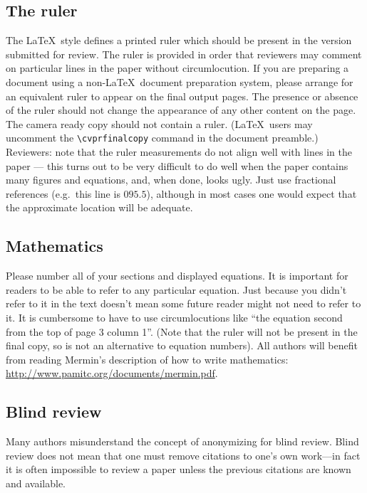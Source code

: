 \subsection{The ruler}
The \LaTeX\ style defines a printed ruler which should be present in the
version submitted for review.  The ruler is provided in order that
reviewers may comment on particular lines in the paper without
circumlocution.  If you are preparing a document using a non-\LaTeX\
document preparation system, please arrange for an equivalent ruler to
appear on the final output pages.  The presence or absence of the ruler
should not change the appearance of any other content on the page.  The
camera ready copy should not contain a ruler. (\LaTeX\ users may uncomment
the \verb'\cvprfinalcopy' command in the document preamble.)  Reviewers:
note that the ruler measurements do not align well with lines in the paper
--- this turns out to be very difficult to do well when the paper contains
many figures and equations, and, when done, looks ugly.  Just use fractional
references (e.g.\ this line is $095.5$), although in most cases one would
expect that the approximate location will be adequate.

\subsection{Mathematics}

Please number all of your sections and displayed equations.  It is
important for readers to be able to refer to any particular equation.  Just
because you didn't refer to it in the text doesn't mean some future reader
might not need to refer to it.  It is cumbersome to have to use
circumlocutions like ``the equation second from the top of page 3 column
1''.  (Note that the ruler will not be present in the final copy, so is not
an alternative to equation numbers).  All authors will benefit from reading
Mermin's description of how to write mathematics:
\url{http://www.pamitc.org/documents/mermin.pdf}.


\subsection{Blind review}

Many authors misunderstand the concept of anonymizing for blind
review.  Blind review does not mean that one must remove
citations to one's own work---in fact it is often impossible to
review a paper unless the previous citations are known and
available.

